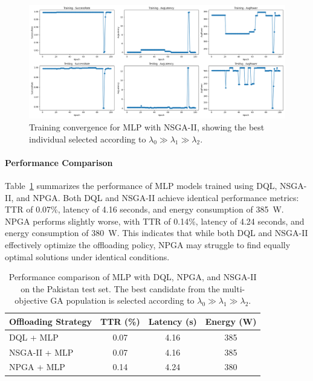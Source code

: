\documentclass[preprint,3p,authoryear]{elsarticle}
\begin{document}
\begin{figure}[H]
    \centering
    \includegraphics[width=0.95\linewidth]{figs/nsga2_mlp_training_epoch.png}
    \caption{Training convergence for MLP with NSGA-II, showing the best individual selected according to \(\lambda_0 \gg \lambda_1 \gg \lambda_2\).}  
    \label{fig:nsga2-mlp-training-epoch}  
\end{figure}

\paragraph{Performance Comparison}
Table~\ref{tab:mlp_comparison} summarizes the performance of MLP models trained using DQL, NSGA-II, and NPGA. Both DQL and NSGA-II achieve identical performance metrics: TTR of 0.07\%, latency of 4.16 seconds, and energy consumption of 385~W. NPGA performs slightly worse, with TTR of 0.14\%, latency of 4.24 seconds, and energy consumption of 380~W. This indicates that while both DQL and NSGA-II effectively optimize the offloading policy, NPGA may struggle to find equally optimal solutions under identical conditions.

\begin{table}[htbp]
\centering
\begin{tabular}{lccc}
\toprule
\textbf{Offloading Strategy} & \textbf{TTR (\%)} & \textbf{Latency (s)} & \textbf{Energy (W)} \\
\midrule
DQL + MLP & 0.07 & 4.16 & 385 \\
NSGA-II + MLP & 0.07 & 4.16 & 385 \\
NPGA + MLP & 0.14 & 4.24 & 380 \\
\bottomrule
\end{tabular}
\caption{Performance comparison of MLP with DQL, NPGA, and NSGA-II on the Pakistan test set. The best candidate from the multi-objective GA population is selected according to \(\lambda_0 \gg \lambda_1 \gg \lambda_2\).}
\label{tab:mlp_comparison}
\end{table}
\end{document}
